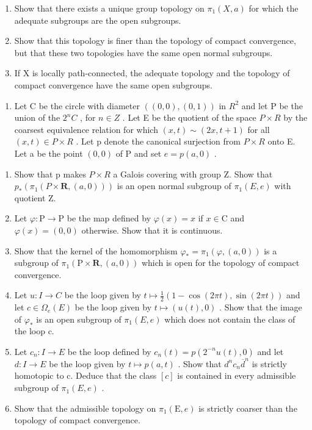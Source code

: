 \begin{enumerate}
\def\labelenumi{\alph{enumi})}
\item
  Show that there exists a unique group topology on \(\pi_{1}(X,a)\) for which the adequate subgroups are the open subgroups.
\item
  Show that this topology is finer than the topology of compact convergence, but that these two topologies have the same open normal subgroups.
\item
  If X is locally path-connected, the adequate topology and the topology of compact convergence have the same open subgroups.
\end{enumerate}

\begin{enumerate}
\def\labelenumi{\arabic{enumi})}
\setcounter{enumi}{2}
\tightlist
\item
  Let C be the circle with diameter \(((0,0),(0,1))\) in \(R^{2}\) and let P be the union of the \(2^{n}C\) , for \(n \in Z\) . Let E be the quotient of the space \(P \times R\) by the coarsest equivalence relation for which \((x,t) \sim (2x,t+1)\) for all \((x,t) \in P \times R\) . Let p denote the canonical surjection from \(P \times R\) onto E. Let a be the point \((0,0)\) of P and set \(e = p(a,0)\) .
\end{enumerate}

\begin{enumerate}
\def\labelenumi{\alph{enumi})}
\item
  Show that p makes \(P \times R\) a Galois covering with group Z. Show that \(p_{*}(\pi_{1}(P \times \mathbf{R}, (a,0)))\) is an open normal subgroup of \(\pi_{1}(E, e)\) with quotient Z.
\item
  Let \(\varphi\colon\mathrm{P}\to\mathrm{P}\) be the map defined by \(\varphi(x)=x\) if \(x\in\mathrm{C}\) and \(\varphi(x)=(0,0)\) otherwise. Show that it is continuous.
\item
  Show that the kernel of the homomorphism \(\varphi_{*} = \pi_{1}(\varphi, (a,0))\) is a subgroup of \(\pi_{1}(\mathrm{P} \times \mathbf{R}, (a,0))\) which is open for the topology of compact convergence.
\item
  Let \(u: I \to C\) be the loop given by \(t \mapsto \frac{1}{2}(1 - \cos(2\pi t), \sin(2\pi t))\) and let \(c \in \Omega_e(E)\) be the loop given by \(t \mapsto (u(t), 0)\) . Show that the image of \(\varphi_*\) is an open subgroup of \(\pi_1(E, e)\) which does not contain the class of the loop c.
\item
  Let \(c_{n}: I \to E\) be the loop defined by \(c_{n}(t) = p(2^{-n}u(t), 0)\) and let \(d: I \to E\) be the loop given by \(t \mapsto p(a, t)\) . Show that \(d^{n}c_{n}\overline{d}^{n}\) is strictly homotopic to c. Deduce that the class \([c]\) is contained in every admissible subgroup of \(\pi_{1}(E, e)\) .
\item
  Show that the admissible topology on \(\pi_{1}(\mathrm{E},e)\) is strictly coarser than the topology of compact convergence.
\end{enumerate}

